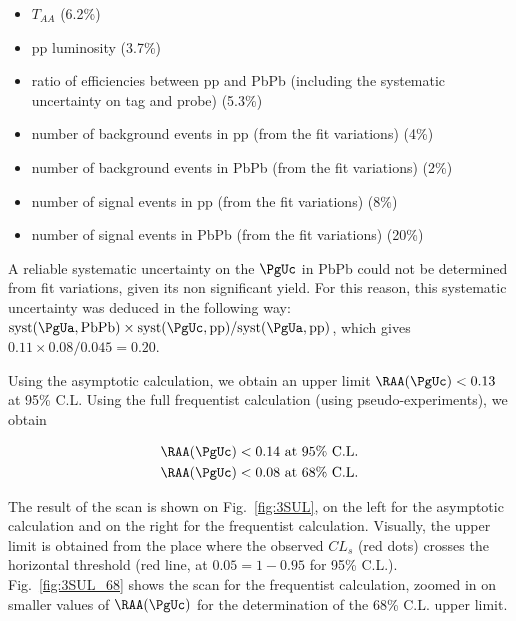 \begin{itemize}
   \item $T_{AA}$ (6.2\%)
   \item pp luminosity (3.7\%)
   \item ratio of efficiencies between pp and PbPb (including the systematic uncertainty on tag and probe) (5.3\%)
   \item number of background events in pp (from the fit variations) (4\%)
   \item number of background events in PbPb (from the fit variations) (2\%)
   \item number of signal events in pp (from the fit variations) (8\%)
   \item number of signal events in PbPb (from the fit variations) (20\%)
\end{itemize}


A reliable systematic uncertainty on the $\PgUc$ in PbPb could not be determined from fit variations, given its non significant yield. For this reason,
this systematic uncertainty was deduced in the following way: 
$\textrm{syst} (\PgUa, \textrm{PbPb}) \times \textrm{syst} (\PgUc, \textrm{pp}) / \textrm{syst} (\PgUa, \textrm{pp})$, which gives $0.11 \times 0.08/0.045 = 0.20$.

Using the asymptotic calculation, we obtain an upper limit $\RAA(\PgUc)<0.13$ at 95\% C.L. Using the full frequentist calculation
(using pseudo-experiments), we obtain

\begin{eqnarray*}
 \RAA(\PgUc)<0.14 \text{   at 95\% C.L.}\\ \nonumber
 \RAA(\PgUc)<0.08 \text{   at 68\% C.L.} \nonumber
\end{eqnarray*}


The result of the scan is shown on Fig.~\ref{fig:3SUL}, on the left for the asymptotic calculation and on the right for the frequentist
calculation. Visually, the upper limit is obtained from the place where the 
observed $CL_s$ (red dots) crosses the horizontal threshold (red line, at $0.05 = 1-0.95$ for 95\% C.L.). Fig.~\ref{fig:3SUL_68} shows the scan for the frequentist
calculation, zoomed in on smaller values of $\RAA(\PgUc)$ for the determination of the 68\% C.L. upper limit.


% 

